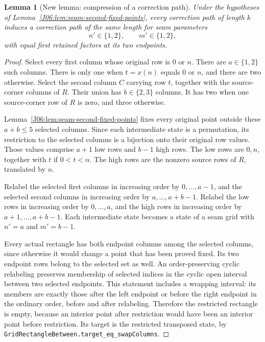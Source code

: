 \documentclass[11pt,oneside]{report}
\newtheorem{lemma}[theorem]{Lemma}
\theoremstyle{definition}
\numberwithin{equation}{section}
\newcommand{\decl}[1]{\textnormal{\nolinkurl{#1}}}
\begin{document}
\begin{lemma}[New lemma: compression of a correction path]
\label{J06:lem:seam-second-compression}
Under the hypotheses of Lemma~\ref{J06:lem:seam-second-fixed-points}, every
correction path of length $k$ induces a correction path of the same
length for seam parameters
\[
 n'\in\{1,2\},\qquad m'\in\{1,2\},
\]
with equal first retained factors at its two endpoints.
\end{lemma}

\begin{proof}
Select every first column whose original row is $0$ or $n$.
There are $a\in\{1,2\}$ such columns. There is only one when
$t=x(n)$ equals $0$ or $n$, and there are two otherwise.
Select the second column $C$ carrying row $t$, together with the
source-corner columns of $R$. Their union has $b\in\{2,3\}$ columns.
It has two when one source-corner row of $R$ is zero, and three otherwise.

Lemma~\ref{J06:lem:seam-second-fixed-points} fixes every original point
outside these $a+b\le5$ selected columns. Since each intermediate
state is a permutation, its restriction to the selected columns is a
bijection onto their original row values. Those values comprise $a+1$
low rows and $b-1$ high rows. The low rows are $0,n$, together with
$t$ if $0<t<n$. The high rows are the nonzero source rows of $R$,
translated by $n$.

Relabel the selected first columns in increasing order by
$0,\ldots,a-1$, and the selected second columns in increasing order
by $a,\ldots,a+b-1$. Relabel the low rows in increasing order by
$0,\ldots,a$, and the high rows in increasing order by
$a+1,\ldots,a+b-1$. Each intermediate state becomes a state of a
seam grid with $n'=a$ and $m'=b-1$.

Every actual rectangle has both endpoint columns among the selected
columns, since otherwise it would change a point that has been proved
fixed. Its two endpoint rows belong to the selected set as well.
An order-preserving cyclic relabeling preserves membership of selected
indices in the cyclic open interval between two selected endpoints.
This statement includes a wrapping interval: its members are exactly
those after the left endpoint or before the right endpoint in the
ordinary order, before and after relabeling.
Therefore the restricted rectangle is empty, because an interior point
after restriction would have been an interior point before restriction.
Its target is the restricted transposed state, by
\decl{GridRectangleBetween.target_eq_swapColumns}.


\end{proof}
\end{document}
